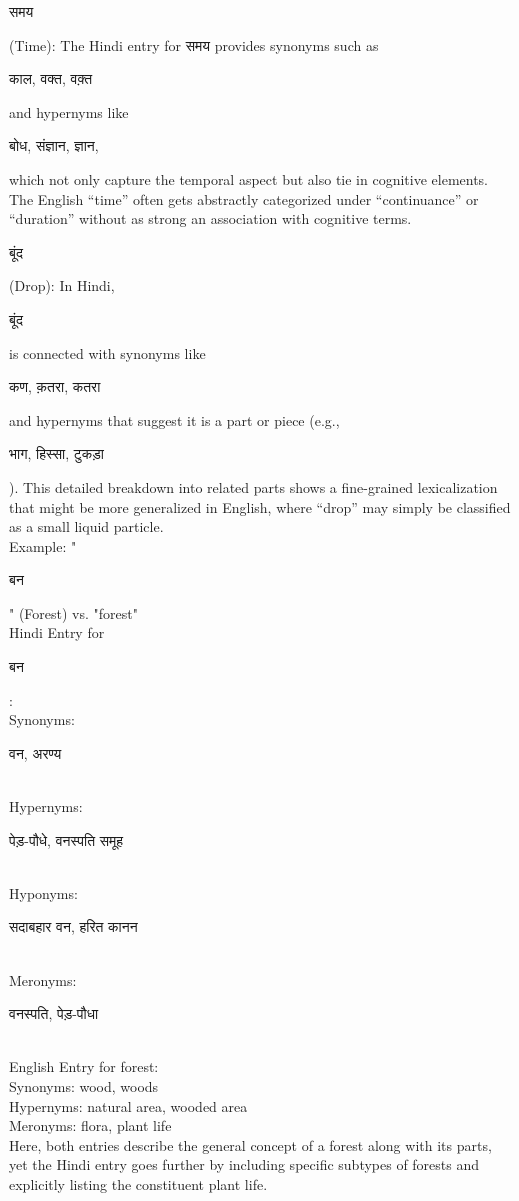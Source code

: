 \documentclass{article}
\begin{document}
\begin{hindi}समय\end{hindi} (Time):
The Hindi entry for समय provides synonyms such as \begin{hindi}काल, वक्त, वक़्त\end{hindi} and hypernyms like \begin{hindi}बोध, संज्ञान, ज्ञान,\end{hindi} which not only capture the temporal aspect but also tie in cognitive elements. The English “time” often gets abstractly categorized under “continuance” or “duration” without as strong an association with cognitive terms.

\begin{hindi}बूंद \end{hindi}(Drop):
In Hindi, \begin{hindi}बूंद\end{hindi} is connected with synonyms like \begin{hindi}कण, क़तरा, कतरा\end{hindi} and hypernyms that suggest it is a part or piece (e.g., \begin{hindi}भाग, हिस्सा, टुकड़ा\end{hindi}). This detailed breakdown into related parts shows a fine-grained lexicalization that might be more generalized in English, where “drop” may simply be classified as a small liquid particle.
\\

Example: "\begin{hindi}बन\end{hindi}" (Forest) vs. "forest"\\
Hindi Entry for \begin{hindi}बन\end{hindi}:\\
Synonyms: \begin{hindi}वन, अरण्य\end{hindi}\\
Hypernyms: \begin{hindi}पेड़-पौधे, वनस्पति समूह\end{hindi}\\
Hyponyms: \begin{hindi}सदाबहार वन, हरित कानन\end{hindi}\\
Meronyms: \begin{hindi}वनस्पति, पेड़-पौधा\end{hindi}\\
English Entry for forest:\\
Synonyms: wood, woods\\
Hypernyms: natural area, wooded area\\
Meronyms: flora, plant life\\
Here, both entries describe the general concept of a forest along with its parts, yet the Hindi entry goes further by including specific subtypes of forests and explicitly listing the constituent plant life.\\
\end{document}
